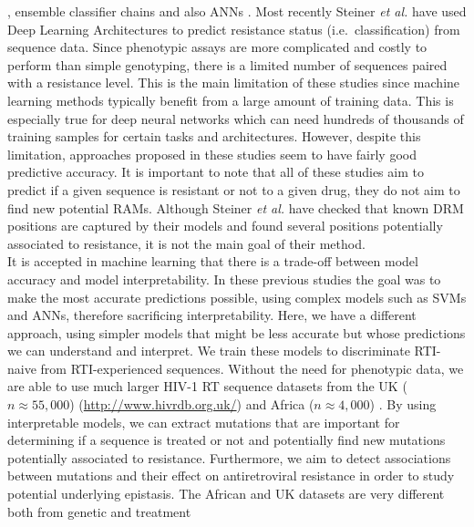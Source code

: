 \documentclass[
  11pt,
  twoside]{scrbook}
\begin{document}
\autocite{beerenwinkelGeno2phenoInterpretingGenotypic2001,arayaSupportVectorMachine2009},
ensemble classifier chains
\autocite{riemenschneiderExploitingHIV1Protease2016a,heiderMultilabelClassificationExploiting2013b}
and also ANNs \autocite{draghiciPredictingHIVDrug2003}. Most recently Steiner
\emph{et al.} \autocite{steinerDrugResistancePrediction2020a} have used Deep Learning
Architectures to predict resistance status (i.e.~classification) from
sequence data. Since phenotypic assays are more complicated and costly
to perform than simple genotyping, there is a limited number of
sequences paired with a resistance level. This is the main limitation of
these studies since machine learning methods typically benefit from a
large amount of training data. This is especially true for deep neural
networks which can need hundreds of thousands of training samples for
certain tasks and architectures. However, despite this limitation,
approaches proposed in these studies seem to have fairly good predictive
accuracy. It is important to note that all of these studies aim to
predict if a given sequence is resistant or not to a given drug, they do
not aim to find new potential RAMs. Although Steiner \emph{et al.}
\autocite{steinerDrugResistancePrediction2020a} have checked that known DRM
positions are captured by their models and found several positions
potentially associated to resistance, it is not the main goal of their
method.\\
It is accepted in machine learning that there is a trade-off between
model accuracy and model interpretability. In these previous studies the
goal was to make the most accurate predictions possible, using complex
models such as SVMs and ANNs, therefore sacrificing interpretability.
Here, we have a different approach, using simpler models that might be
less accurate but whose predictions we can understand and interpret. We
train these models to discriminate RTI-naive from RTI-experienced
sequences. Without the need for phenotypic data, we are able to use much
larger HIV-1 RT sequence datasets from the UK (\(n\approx55,000\))
(\url{http://www.hivrdb.org.uk/}) and Africa (\(n\approx4,000\))
\autocite{villabona-arenasIndepthAnalysisHIV12016}. By using interpretable
models, we can extract mutations that are important for determining if a
sequence is treated or not and potentially find new mutations
potentially associated to resistance. Furthermore, we aim to detect
associations between mutations and their effect on antiretroviral
resistance in order to study potential underlying epistasis. The African
and UK datasets are very different both from genetic and treatment
\end{document}
